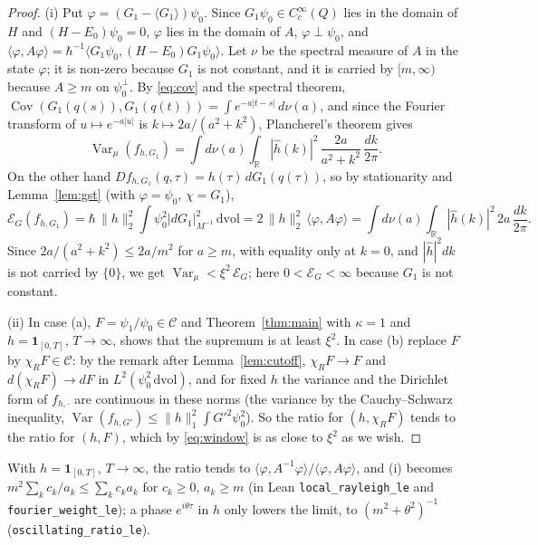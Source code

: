 \documentclass[11pt,a4paper]{article}
\theoremstyle{definition}
\theoremstyle{remark}
\newcommand{\R}{\mathbb{R}}
\newcommand{\Var}{\operatorname{Var}}
\newcommand{\Cov}{\operatorname{Cov}}
\newcommand{\cE}{\mathcal{E}}
\newcommand{\dvol}{\,\mathrm{dvol}}
\newcommand{\code}[1]{\texttt{#1}}
\begin{document}
\begin{proof}
(i) Put $\varphi=(G_1-\langle G_1\rangle)\psi_0$. Since $G_1\psi_0\in C_c^\infty(Q)$ lies in the domain of $H$ and $(H-E_0)\psi_0=0$, $\varphi$ lies in the domain of $A$, $\varphi\perp\psi_0$, and $\langle\varphi,A\varphi\rangle=\hbar^{-1}\langle G_1\psi_0,(H-E_0)G_1\psi_0\rangle$.
Let $\nu$ be the spectral measure of $A$ in the state $\varphi$; it is non-zero because $G_1$ is not constant, and it is carried by $[m,\infty)$ because $A\ge m$ on $\psi_0^\perp$.
By \eqref{eq:cov} and the spectral theorem, $\Cov(G_1(q(s)),G_1(q(t)))=\int e^{-a|t-s|}\,d\nu(a)$, and since the Fourier transform of $u\mapsto e^{-a|u|}$ is $k\mapsto2a/(a^2+k^2)$, Plancherel's theorem gives
\[
  \Var_\mu(f_{h,G_1})=\int d\nu(a)\int_\R|\hat h(k)|^2\,\frac{2a}{a^2+k^2}\,\frac{dk}{2\pi}.
\]
On the other hand $Df_{h,G_1}(q,\tau)=h(\tau)\,dG_1(q(\tau))$, so by stationarity and Lemma~\ref{lem:gst} (with $\varphi=\psi_0$, $\chi=G_1$),
\[
  \cE_G(f_{h,G_1})=\hbar\,\|h\|_2^2\int\psi_0^2|dG_1|^2_{M^{-1}}\dvol=2\,\|h\|_2^2\,\langle\varphi,A\varphi\rangle=\int d\nu(a)\int_\R|\hat h(k)|^2\,2a\,\frac{dk}{2\pi}.
\]
Since $2a/(a^2+k^2)\le 2a/m^2$ for $a\ge m$, with equality only at $k=0$, and $|\hat h|^2dk$ is not carried by $\{0\}$, we get $\Var_\mu<\xi^2\,\cE_G$; here $0<\cE_G<\infty$ because $G_1$ is not constant.

(ii) In case (a), $F=\psi_1/\psi_0\in\mathcal C$ and Theorem~\ref{thm:main} with $\kappa=1$ and $h=\mathbf 1_{[0,T]}$, $T\to\infty$, shows that the supremum is at least $\xi^2$.
In case (b) replace $F$ by $\chi_RF\in\mathcal C$: by the remark after Lemma~\ref{lem:cutoff}, $\chi_RF\to F$ and $d(\chi_RF)\to dF$ in $L^2(\psi_0^2\dvol)$, and for fixed $h$ the variance and the Dirichlet form of $f_{h,\cdot}$ are continuous in these norms (the variance by the Cauchy--Schwarz inequality, $\Var(f_{h,G'})\le\|h\|_1^2\int G'^2\psi_0^2$). So the ratio for $(h,\chi_RF)$ tends to the ratio for $(h,F)$, which by \eqref{eq:window} is as close to $\xi^2$ as we wish.
\end{proof}

With $h=\mathbf 1_{[0,T]}$, $T\to\infty$, the ratio tends to $\langle\varphi,A^{-1}\varphi\rangle/\langle\varphi,A\varphi\rangle$, and (i) becomes $m^2\sum_kc_k/a_k\le\sum_kc_ka_k$ for $c_k\ge0$, $a_k\ge m$ (in Lean \code{local\_\allowbreak{}rayleigh\_le} and \code{fourier\_\allowbreak{}weight\_le}); a phase $e^{i\theta\tau}$ in $h$ only lowers the limit, to $(m^2+\theta^2)^{-1}$ (\code{oscillating\_\allowbreak{}ratio\_le}).
\end{document}
